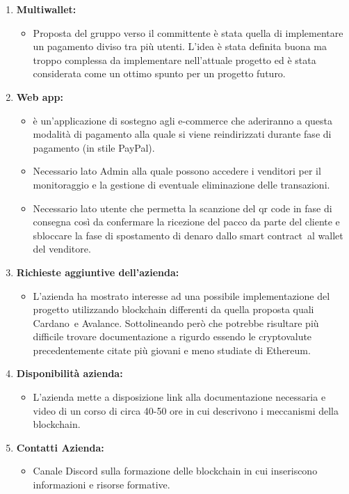 \begin{enumerate}
	\item \textbf{Multiwallet:}
	\begin{itemize}
		\item Proposta del gruppo verso il committente è stata quella di implementare un pagamento diviso tra più utenti.
		 L'idea è stata definita buona ma troppo complessa da implementare nell'attuale progetto ed è stata considerata come un ottimo spunto per un progetto futuro.
	\end{itemize}

	\item \textbf{Web app:}
	\begin{itemize}
		\item è un'applicazione di sostegno agli e-commerce\glo{} che aderiranno a questa modalità di pagamento alla quale si viene reindirizzati durante fase di pagamento (in stile PayPal).
		\item Necessario lato Admin alla quale possono accedere i venditori per il monitoraggio e la gestione di eventuale eliminazione delle transazioni. 
		\item Necessario lato utente che permetta la scanzione del qr code\glo{} in fase di consegna così da confermare la ricezione del pacco da parte del cliente e sbloccare la fase di spostamento di denaro dallo smart contract\glo\ al wallet del venditore.
	\end{itemize}

	\item \textbf{Richieste aggiuntive dell'azienda:}
	\begin{itemize}
		\item L'azienda ha mostrato interesse ad una possibile implementazione del progetto utilizzando blockchain\glo{} differenti da quella proposta quali Cardano\glo\ e Avalance\glo.
		 Sottolineando però che potrebbe risultare più difficile trovare documentazione a rigurdo essendo le cryptovalute precedentemente citate più giovani e meno studiate di Ethereum\glo.
	\end{itemize}

	\item \textbf{Disponibilità azienda:}
	\begin{itemize}
		\item L'azienda mette a disposizione link alla documentazione necessaria e video di un corso di circa 40-50 ore in cui descrivono i meccanismi della blockchain\glo{}.
		
	\end{itemize}

	\item \textbf{Contatti Azienda:}
	\begin{itemize}
		\item Canale Discord\glo{} sulla formazione delle blockchain\glo{} in cui inseriscono informazioni e risorse formative.
	\end{itemize}


\end{enumerate}
